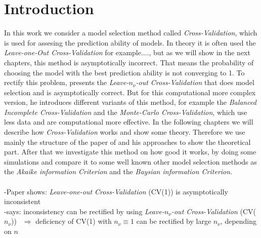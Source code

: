\documentclass[Research_Module_ES.tex]{subfiles}
\begin{document}
\section{Introduction}	
In this work we consider a model selection method  called \textit{Cross-Validation}, which is used for assesing the prediction ability of models.
In theory it is often used the \textit{Leave-one-Out Cross-Validation}
for example...., but as we will show in the next chapters, this method is asymptotically incorrect.
That means the probability of choosing the model with the best prediction ability is not converging to 1.
To rectify this problem, \cite{shao} presents the \textit{Leave-$n_\nu$-out Cross-Validation} that does model selection and is asymptotically correct. But for this computational more complex version, he introduces different variants of this method, for example the \textit{Balanced Incomplete Cross-Validation} and the \textit{Monte-Carlo Cross-Validation}, which use less data and are computational more effective. In the following chapters we will describe how \textit{Cross-Validation} works and show some theory. Therefore we use mainly the structure of the paper of \cite{shao} and his approaches to show the theoretical part. After that we investigate this method on how good it works, by doing some simulations and compare it to some well known other model selection methods as the \textit{Akaike information Criterion} and the \textit{Baysian information Criterion}.\\\\


-Paper shows: \textit{Leave-one-out Cross-Validation} (CV(1)) is asymptotically inconsistent\\
-says: inconsistency can be rectified by using \textit{Leave-$n_\nu$-out Cross-Validation} (CV($n_\nu$))
$~~\Rightarrow$ deficiency of CV(1) with $n_\nu\equiv 1$ can be rectified by large $n_\nu$, depending on $n$
\end{document}
